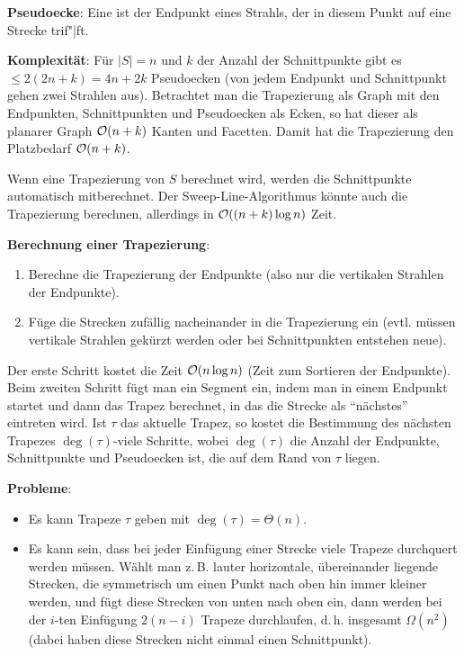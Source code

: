 \textbf{Pseudoecke}:
Eine  ist der Endpunkt eines Strahls,
der in diesem Punkt auf eine Strecke trif"|ft.

\textbf{Komplexität}:
Für $|S| = n$ und $k$ der Anzahl der Schnittpunkte gibt es $\le 2(2n + k) = 4n + 2k$ Pseudoecken
(von jedem Endpunkt und Schnittpunkt gehen zwei Strahlen aus).
Betrachtet man die Trapezierung als Graph mit den Endpunkten, Schnittpunkten und
Pseudoecken als Ecken, so hat dieser als planarer Graph $\mathcal{O}(n + k)$ Kanten und Facetten.
Damit hat die Trapezierung den Platzbedarf $\mathcal{O}(n + k)$.

\linie

Wenn eine Trapezierung von $S$ berechnet wird, werden die Schnittpunkte automatisch mitberechnet.
Der Sweep-Line-Algorithmus könnte auch die Trapezierung berechnen, allerdings in
$\mathcal{O}((n + k)\log n)$ Zeit.

\textbf{Berechnung einer Trapezierung}:
\begin{enumerate}
    \item
    Berechne die Trapezierung der Endpunkte
    (also nur die vertikalen Strahlen der Endpunkte).

    \item
    Füge die Strecken zufällig nacheinander in die Trapezierung ein
    (evtl. müssen vertikale Strahlen gekürzt werden oder bei Schnittpunkten
    entstehen neue).
\end{enumerate}
Der erste Schritt kostet die Zeit $\mathcal{O}(n \log n)$ (Zeit zum Sortieren der Endpunkte).
Beim zweiten Schritt fügt man ein Segment ein, indem man in einem Endpunkt startet und dann
das Trapez berechnet, in das die Strecke als "`nächstes"' eintreten wird.
Ist $\tau$ das aktuelle Trapez, so kostet die Bestimmung des nächsten Trapezes
$\deg(\tau)$-viele Schritte, wobei $\deg(\tau)$ die Anzahl der Endpunkte, Schnittpunkte und
Pseudoecken ist, die auf dem Rand von $\tau$ liegen.

\textbf{Probleme}:
\begin{itemize}
    \item
    Es kann Trapeze $\tau$ geben mit $\deg(\tau) = \Theta(n)$.

    \item
    Es kann sein, dass bei jeder Einfügung einer Strecke viele Trapeze durchquert werden müssen.
    Wählt man z.\,B. lauter horizontale, übereinander liegende Strecken, die symmetrisch um einen
    Punkt nach oben hin immer kleiner werden, und fügt diese Strecken von unten nach oben ein,
    dann werden bei der $i$-ten Einfügung $2(n - i)$ Trapeze durchlaufen, d.\,h.
    insgesamt $\Omega(n^2)$
    (dabei haben diese Strecken nicht einmal einen Schnittpunkt).
\end{itemize}


